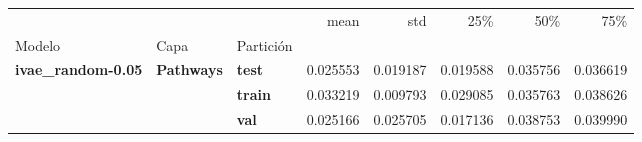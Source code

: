 \begin{tabular}{lllrrrrr}
\toprule
 &  &  & mean & std & 25\% & 50\% & 75\% \\
Modelo & Capa & Partición &  &  &  &  &  \\
\midrule
\multirow[t]{3}{*}{\textbf{ivae\_random-0.05}} & \multirow[t]{3}{*}{\textbf{Pathways}} & \textbf{test} & 0.025553 & 0.019187 & 0.019588 & 0.035756 & 0.036619 \\
\textbf{} & \textbf{} & \textbf{train} & 0.033219 & 0.009793 & 0.029085 & 0.035763 & 0.038626 \\
\textbf{} & \textbf{} & \textbf{val} & 0.025166 & 0.025705 & 0.017136 & 0.038753 & 0.039990 \\
\cline{1-8} \cline{2-8}
\bottomrule
\end{tabular}
